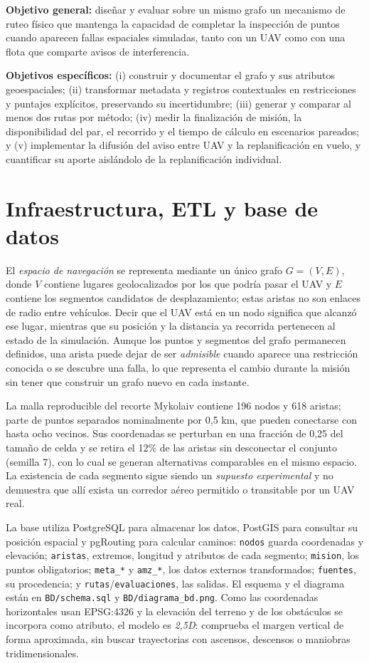 \documentclass[journal,10pt]{IEEEtran}
\begin{document}
\textbf{Objetivo general:} diseñar y evaluar sobre un mismo grafo un mecanismo
de ruteo físico que mantenga la capacidad de completar la inspección de puntos
cuando aparecen fallas espaciales simuladas, tanto con un UAV como con una
flota que comparte avisos de interferencia.

\textbf{Objetivos específicos:} (i) construir y documentar el grafo y sus
atributos geoespaciales; (ii) transformar metadata y registros contextuales
en restricciones y puntajes explícitos, preservando su incertidumbre;
(iii) generar y comparar al menos dos rutas por método; (iv) medir la
finalización de misión, la disponibilidad del par, el recorrido y el tiempo
de cálculo en escenarios pareados; y (v) implementar la difusión del aviso
entre UAV y la replanificación en vuelo, y cuantificar su aporte aislándolo
de la replanificación individual.

\section{Infraestructura, ETL y base de datos}

El \emph{espacio de navegación} se representa mediante un único grafo
$G=(V,E)$, donde $V$ contiene lugares geolocalizados por los que podría
pasar el UAV y $E$ contiene los segmentos candidatos de desplazamiento;
estas aristas no son enlaces de radio entre vehículos. Decir que el UAV
está en un nodo significa que alcanzó ese lugar, mientras que su posición
y la distancia ya recorrida pertenecen al estado de la simulación. Aunque
los puntos y segmentos del grafo permanecen definidos, una arista puede
dejar de ser \emph{admisible} cuando aparece una restricción conocida o se
descubre una falla, lo que representa el cambio durante la misión sin
tener que construir un grafo nuevo en cada instante.

La malla reproducible del recorte Mykolaiv contiene 196 nodos y 618
aristas; parte de puntos separados nominalmente por 0,5 km, que pueden
conectarse con hasta ocho vecinos. Sus coordenadas se perturban en una
fracción de 0,25 del tamaño de celda y se retira el 12\% de las aristas
sin desconectar el conjunto (semilla 7), con lo cual se generan
alternativas comparables en el mismo espacio. La existencia de cada
segmento sigue siendo un \emph{supuesto experimental} y no demuestra que
allí exista un corredor aéreo permitido o transitable por un UAV real.

La base utiliza PostgreSQL para almacenar los datos, PostGIS para consultar
su posición espacial y pgRouting para calcular caminos: \texttt{nodos}
guarda coordenadas y elevación; \texttt{aristas}, extremos, longitud y
atributos de cada segmento; \texttt{mision}, los puntos obligatorios;
\texttt{meta\_*} y \texttt{amz\_*}, los datos externos transformados;
\texttt{fuentes}, su procedencia; y \texttt{rutas}/\texttt{evaluaciones},
las salidas. El esquema y el diagrama están en \texttt{BD/schema.sql} y
\texttt{BD/diagrama\_bd.png}. Como las coordenadas horizontales usan
EPSG:4326 y la elevación del terreno y de los obstáculos se incorpora
como atributo, el modelo es \emph{2,5D}: comprueba el margen vertical de
forma aproximada, sin buscar trayectorias con ascensos, descensos o
maniobras tridimensionales.
\end{document}
